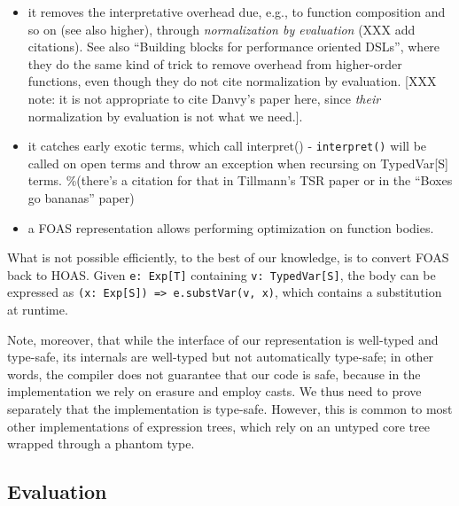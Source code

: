 \documentclass{article}
\begin{document}
\begin{itemize}
\item
  it removes the interpretative overhead due, e.g., to function
  composition and so on (see also higher), through \emph{normalization
  by evaluation} (XXX add citations). See also ``Building blocks for
  performance oriented DSLs'', where they do the same kind of trick to
  remove overhead from higher-order functions, even though they do not
  cite normalization by evaluation. {[}XXX note: it is not appropriate
  to cite Danvy's paper here, since \emph{their} normalization by
  evaluation is not what we need.{]}.
\item
  it catches early exotic terms, which call interpret() -
  \texttt{interpret()} will be called on open terms and throw an
  exception when recursing on TypedVar{[}S{]} terms. \%(there's a
  citation for that in Tillmann's TSR paper or in the ``Boxes go
  bananas'' paper)
\item
  a FOAS representation allows performing optimization on function
  bodies.
\end{itemize}
What is not possible efficiently, to the best of our knowledge, is to
convert FOAS back to HOAS. Given \texttt{e: Exp{[}T{]}} containing
\texttt{v: TypedVar{[}S{]}}, the body can be expressed as
\texttt{(x: Exp{[}S{]}) =\textgreater{} e.substVar(v, x)}, which
contains a substitution at runtime.

Note, moreover, that while the interface of our representation is
well-typed and type-safe, its internals are well-typed but not
automatically type-safe; in other words, the compiler does not guarantee
that our code is safe, because in the implementation we rely on erasure
and employ casts. We thus need to prove separately that the
implementation is type-safe. However, this is common to most other
implementations of expression trees, which rely on an untyped core tree
wrapped through a phantom type.

\subsection{Evaluation}
\end{document}
